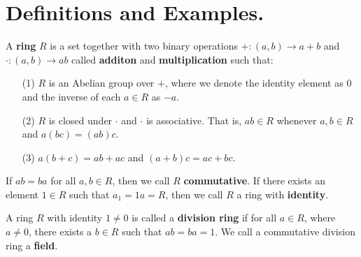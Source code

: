 
\section{Definitions and Examples.}
\label{section1}

\begin{definition}
    A \textbf{ring} $R$ is a set together with two binary operations  $+:(a,b)
    \xrightarrow{} a+b$ and $\cdot:(a,b) \xrightarrow{} ab$ called
    \textbf{additon} and \textbf{multiplication} such that:
    \begin{enumerate}
        \item[(1)] $R$ is an Abelian group over $+$, where we denote the
            identity element as $0$ and the inverse of each $a \in R$ as $-a$.

        \item[(2)] $R$ is closed under  $\cdot$ and  $\cdot$ is associative.
            That is, $ab \in R$ whenever  $a,b \in R$ and  $a(bc)=(ab)c$.

        \item[(3)] $a(b+c)=ab+ac$ and $(a+b)c=ac+bc$.
    \end{enumerate}
    If $ab=ba$ for all  $a,b \in R$, then we call $R$ \textbf{commutative}. If
    there exists an element $1 \in R$ such that  $a_1=1a=R$, then we call $R$ a
    ring with  \textbf{identity}.
\end{definition}

\begin{definition}
    A ring $R$ with identity $1 \neq 0$ is called a \textbf{division ring} if
    for all $a \in R$, where  $a \neq 0$, there exists a  $b \in R$ such that
    $ab=ba=1$. We call a commutative division ring a \textbf{field}.
\end{definition}

